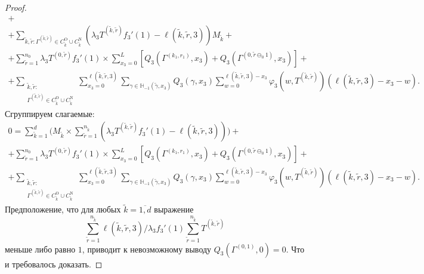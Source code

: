 \begin{proof}
\begin{multline}
 +\\+ \sum_{\tilde{k}, \tilde{r}\colon \Gamma^{(\tilde{k},  \tilde{r})} \in C_{\tilde{k}}^{\mathrm{O}}\cup C_{\tilde{k}}^{\mathrm{N}}} (\lambda_3 T^{(\tilde{k}, \tilde{r})} f_3'(1) - \ell(\tilde{k}, \tilde{r}, 3)) M_{\tilde{k}}   +\\+ \sum_{\tilde{r}=1}^{n_0} \lambda_3 T^{(0, \tilde{r})} f_3'(1)  \times \sum_{x_3=0}^{L} \left[ Q_3(\Gamma^{(k_1, r_1)}, x_3) + Q_3(\Gamma^{(0, \tilde{r}\ominus_0 1)}, x_3) \right]   +\\+  \sum_{\substack{\tilde{k}, \tilde{r}\colon\\ \Gamma^{(\tilde{k},  \tilde{r})} \in C_{\tilde{k}}^{\mathrm{O}}\cup C_{\tilde{k}}^{\mathrm{N}}}} \sum_{x_3=0}^{\ell(\tilde{k}, \tilde{r}, 3)}\sum_{\gamma \in {\mathbb H}_{-1}(\tilde{\gamma}, x_3)} Q_3(\gamma, x_3) \sum_{w=0}^{\ell(\tilde{k}, \tilde{r}, 3) - x_3} \varphi_3(w, T^{(\tilde{k}, \tilde{r})}) (\ell(\tilde{k}, \tilde{r}, 3)-x_3 - w).
 \label{neccessary:to:paste:one}
\end{multline}
Сгруппируем слагаемые:
\begin{multline}
 0 = \sum_{\tilde{k} = 1}^d \biggl( M_{\tilde{k}} \times \sum_{\tilde{r} = 1}^{n_{\tilde{k}}} (\lambda_3 T^{(\tilde{k}, \tilde{r})} f_3'(1) - \ell(\tilde{k}, \tilde{r}, 3))\biggr)
 +\\+ \sum_{\tilde{r}=1}^{n_0} \lambda_3 T^{(0, \tilde{r})} f_3'(1)  \times \sum_{x_3=0}^{L} \left[ Q_3(\Gamma^{(k_1, r_1)}, x_3) + Q_3(\Gamma^{(0, \tilde{r}\ominus_0 1)}, x_3) \right]   +\\+  \sum_{\substack{\tilde{k}, \tilde{r}\colon \\ \Gamma^{(\tilde{k},  \tilde{r})} \in C_{\tilde{k}}^{\mathrm{O}}\cup C_{\tilde{k}}^{\mathrm{N}}}} \sum_{x_3=0}^{\ell(\tilde{k}, \tilde{r}, 3)}\sum_{\gamma \in {\mathbb H}_{-1}(\tilde{\gamma}, x_3)} Q_3(\gamma, x_3) \sum_{w=0}^{\ell(\tilde{k}, \tilde{r}, 3) - x_3} \varphi_3(w, T^{(\tilde{k}, \tilde{r})}) (\ell(\tilde{k}, \tilde{r}, 3)-x_3 - w).
 \label{neccessary:to:paste:two}
\end{multline}
Предположение,  что для любых $\tilde{k}=\overline{1, d}$  выражение 
$$
\sum_{\tilde{r} = 1}^{n_{\tilde{k}}}\ell(\tilde{k}, \tilde{r}, 3) \big/\lambda_3 f_3'(1) \sum_{\tilde{r} = 1}^{n_{\tilde{k}}} T^{(\tilde{k}, \tilde{r})} 
$$
меньше либо равно $1$,  приводит к невозможному выводу $Q_3(\Gamma^{(0, 1)}, 0) = 0$. Что и требовалось доказать.

\end{proof}

















